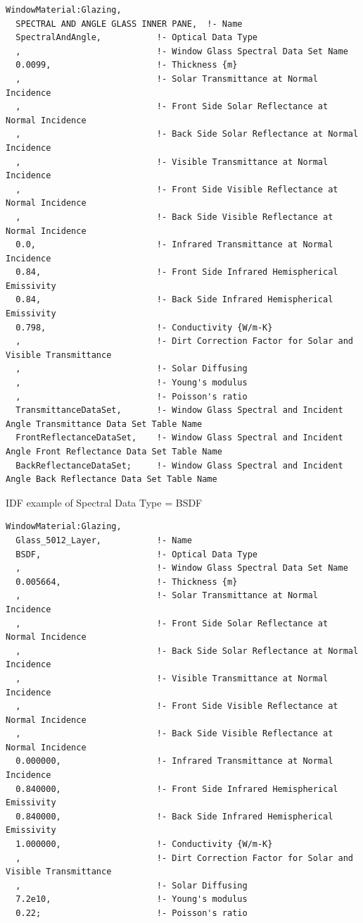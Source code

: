 \begin{lstlisting}
WindowMaterial:Glazing,
  SPECTRAL AND ANGLE GLASS INNER PANE,  !- Name
  SpectralAndAngle,           !- Optical Data Type
  ,                           !- Window Glass Spectral Data Set Name
  0.0099,                     !- Thickness {m}
  ,                           !- Solar Transmittance at Normal Incidence
  ,                           !- Front Side Solar Reflectance at Normal Incidence
  ,                           !- Back Side Solar Reflectance at Normal Incidence
  ,                           !- Visible Transmittance at Normal Incidence
  ,                           !- Front Side Visible Reflectance at Normal Incidence
  ,                           !- Back Side Visible Reflectance at Normal Incidence
  0.0,                        !- Infrared Transmittance at Normal Incidence
  0.84,                       !- Front Side Infrared Hemispherical Emissivity
  0.84,                       !- Back Side Infrared Hemispherical Emissivity
  0.798,                      !- Conductivity {W/m-K}
  ,                           !- Dirt Correction Factor for Solar and Visible Transmittance
  ,                           !- Solar Diffusing
  ,                           !- Young's modulus
  ,                           !- Poisson's ratio
  TransmittanceDataSet,       !- Window Glass Spectral and Incident Angle Transmittance Data Set Table Name
  FrontReflectanceDataSet,    !- Window Glass Spectral and Incident Angle Front Reflectance Data Set Table Name
  BackReflectanceDataSet;     !- Window Glass Spectral and Incident Angle Back Reflectance Data Set Table Name
\end{lstlisting}

IDF example of Spectral Data Type = BSDF

\begin{lstlisting}
WindowMaterial:Glazing,
  Glass_5012_Layer,           !- Name
  BSDF,                       !- Optical Data Type
  ,                           !- Window Glass Spectral Data Set Name
  0.005664,                   !- Thickness {m}
  ,                           !- Solar Transmittance at Normal Incidence
  ,                           !- Front Side Solar Reflectance at Normal Incidence
  ,                           !- Back Side Solar Reflectance at Normal Incidence
  ,                           !- Visible Transmittance at Normal Incidence
  ,                           !- Front Side Visible Reflectance at Normal Incidence
  ,                           !- Back Side Visible Reflectance at Normal Incidence
  0.000000,                   !- Infrared Transmittance at Normal Incidence
  0.840000,                   !- Front Side Infrared Hemispherical Emissivity
  0.840000,                   !- Back Side Infrared Hemispherical Emissivity
  1.000000,                   !- Conductivity {W/m-K}
  ,                           !- Dirt Correction Factor for Solar and Visible Transmittance
  ,                           !- Solar Diffusing
  7.2e10,                     !- Young's modulus
  0.22;                       !- Poisson's ratio
\end{lstlisting}

